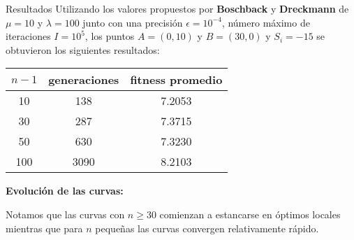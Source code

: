 \documentclass[10pt, letterpaper]{article}
\theoremstyle{definition}
\begin{document}
\begin{section}{Resultados}
    Utilizando los valores propuestos por \textbf{Boschback} y \textbf{Dreckmann}
    de $\mu=10$ y $\lambda=100$ junto con una precisión $\epsilon=10^{-4}$,
    número máximo de iteraciones $I=10^5$, los puntos $A=(0, 10)$ y $B=(30, 0)$
    y $S_i = -15$ se obtuvieron los siguientes resultados:

    \begin{center} \begin{tabular}{ |c|c|c| }
        \hline
        $n - 1$ & generaciones & fitness promedio \\
        \hline
        10  & 138 & 7.2053 \\
        30  & 287 & 7.3715 \\
        50  & 630 & 7.3230 \\
        100  & 3090 & 8.2103 \\
        \hline
    \end{tabular} \end{center}

    \textbf{Evolución de las curvas:}

    Notamos que las curvas con $n \geq 30$ comienzan a estancarse en óptimos
    locales mientras que para $n$ pequeñas las curvas convergen relativamente
    rápido.
\end{section}
\end{document}
